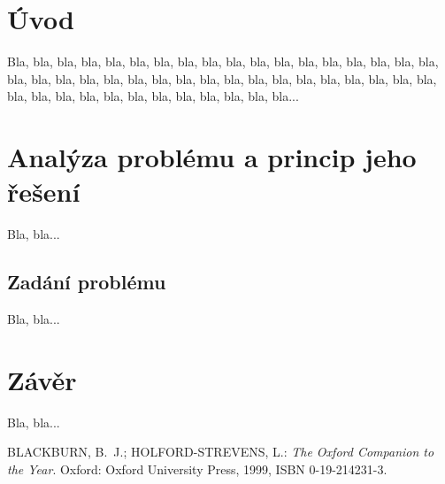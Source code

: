 \documentclass[12pt,a4paper,titlepage,final]{article}
\begin{document}



\pagestyle{plain}
\setcounter{page}{1}
\tableofcontents

\newpage
\pagestyle{plain}
\setcounter{page}{1}

\section{Úvod} \label{uvod}

Bla, bla, bla, bla, bla, bla, bla, bla, bla, bla, bla, bla, bla, bla, bla, bla,
bla, bla, bla, bla, bla, bla, bla, bla, bla, bla, bla, bla, bla, bla, bla, bla,
bla, bla, bla, bla, bla, bla, bla, bla, bla, bla, bla, bla, bla, bla, bla, bla...

\section{Analýza problému a princip jeho řešení} \label{analyza}

Bla, bla...

\subsection{Zadání problému}

Bla, bla...

\section{Závěr} \label{zaver}

Bla, bla...

\begin{thebibliography}{1}

BLACKBURN, B.~J.; HOLFORD-STREVENS, L.: \emph{The Oxford Companion to the
  Year}. Oxford: Oxford University Press, 1999, ISBN 0-19-214231-3.


\end{thebibliography}
\appendix
\end{document}
